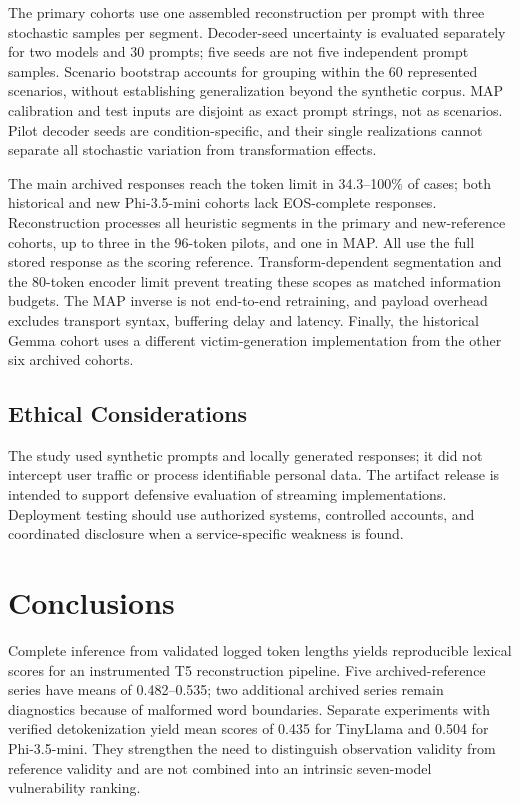 \documentclass[electronics,article,submit,pdftex,moreauthors]{Definitions/mdpi}
\begin{document}
The primary cohorts use one assembled reconstruction per prompt with three stochastic samples per segment. Decoder-seed uncertainty is evaluated separately for two models and 30 prompts; five seeds are not five independent prompt samples. Scenario bootstrap accounts for grouping within the 60 represented scenarios, without establishing generalization beyond the synthetic corpus. MAP calibration and test inputs are disjoint as exact prompt strings, not as scenarios. Pilot decoder seeds are condition-specific, and their single realizations cannot separate all stochastic variation from transformation effects.

The main archived responses reach the token limit in 34.3--100\% of cases; both historical and new Phi-3.5-mini cohorts lack EOS-complete responses. Reconstruction processes all heuristic segments in the primary and new-reference cohorts, up to three in the 96-token pilots, and one in MAP. All use the full stored response as the scoring reference. Transform-dependent segmentation and the 80-token encoder limit prevent treating these scopes as matched information budgets. The MAP inverse is not end-to-end retraining, and payload overhead excludes transport syntax, buffering delay and latency. Finally, the historical Gemma cohort uses a different victim-generation implementation from the other six archived cohorts.

\subsection{Ethical Considerations}
The study used synthetic prompts and locally generated responses; it did not intercept user traffic or process identifiable personal data. The artifact release is intended to support defensive evaluation of streaming implementations. Deployment testing should use authorized systems, controlled accounts, and coordinated disclosure when a service-specific weakness is found.

\section{Conclusions}
Complete inference from validated logged token lengths yields reproducible lexical scores for an instrumented T5 reconstruction pipeline. Five archived-reference series have means of 0.482--0.535; two additional archived series remain diagnostics because of malformed word boundaries. Separate experiments with verified detokenization yield mean scores of 0.435 for TinyLlama and 0.504 for Phi-3.5-mini. They strengthen the need to distinguish observation validity from reference validity and are not combined into an intrinsic seven-model vulnerability ranking.
\end{document}
